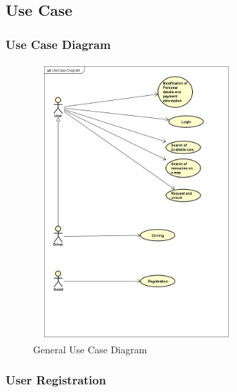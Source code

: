 \subsection{Use Case}

\subsubsection{Use Case Diagram}
	
	
\begin{figure}[h]
	\centering
	\includegraphics[width=300px, height=400px]{img/UseCase_Diagram}
	\caption{General Use Case Diagram}
\end{figure}
	
\pagebreak



\subsubsection{User Registration}



	
	
